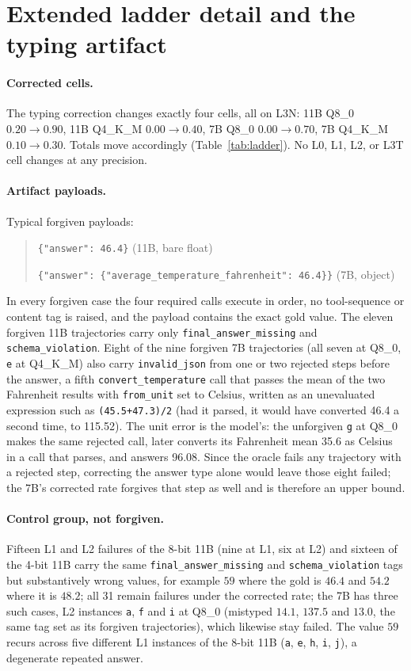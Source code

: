 \documentclass[11pt]{article}
\begin{document}
\FloatBarrier
\section{Extended ladder detail and the typing artifact}
\label{app:ladder}

\paragraph{Corrected cells.} The typing correction changes exactly four cells, all on L3N: 11B Q8\_0 $0.20 \to 0.90$, 11B Q4\_K\_M $0.00 \to 0.40$, 7B Q8\_0 $0.00 \to 0.70$, 7B Q4\_K\_M $0.10 \to 0.30$. Totals move accordingly (Table~\ref{tab:ladder}). No L0, L1, L2, or L3T cell changes at any precision.

\paragraph{Artifact payloads.} Typical forgiven payloads:
\begin{quote}\small
\verb|{"answer": 46.4}| \hfill (11B, bare float)

\verb|{"answer": {"average_temperature_fahrenheit": 46.4}}| \hfill (7B, object)
\end{quote}
In every forgiven case the four required calls execute in order, no tool-sequence or content tag is raised, and the payload contains the exact gold value. The eleven forgiven 11B trajectories carry only \texttt{final\_answer\_missing} and \texttt{schema\_violation}. Eight of the nine forgiven 7B trajectories (all seven at Q8\_0, \texttt{e} at Q4\_K\_M) also carry \texttt{invalid\_json} from one or two rejected steps before the answer, a fifth \texttt{convert\_temperature} call that passes the mean of the two Fahrenheit results with \texttt{from\_unit} set to Celsius, written as an unevaluated expression such as \verb|(45.5+47.3)/2| (had it parsed, it would have converted 46.4 a second time, to 115.52). The unit error is the model's: the unforgiven \texttt{g} at Q8\_0 makes the same rejected call, later converts its Fahrenheit mean 35.6 as Celsius in a call that parses, and answers 96.08. Since the oracle fails any trajectory with a rejected step, correcting the answer type alone would leave those eight failed; the 7B's corrected rate forgives that step as well and is therefore an upper bound.

\paragraph{Control group, not forgiven.} Fifteen L1 and L2 failures of the 8-bit 11B (nine at L1, six at L2) and sixteen of the 4-bit 11B carry the same \texttt{final\_answer\_missing} and \texttt{schema\_violation} tags but substantively wrong values, for example $59$ where the gold is $46.4$ and $54.2$ where it is $48.2$; all 31 remain failures under the corrected rate; the 7B has three such cases, L2 instances \texttt{a}, \texttt{f} and \texttt{i} at Q8\_0 (mistyped $14.1$, $137.5$ and $13.0$, the same tag set as its forgiven trajectories), which likewise stay failed. The value $59$ recurs across five different L1 instances of the 8-bit 11B (\texttt{a}, \texttt{e}, \texttt{h}, \texttt{i}, \texttt{j}), a degenerate repeated answer.
\end{document}
